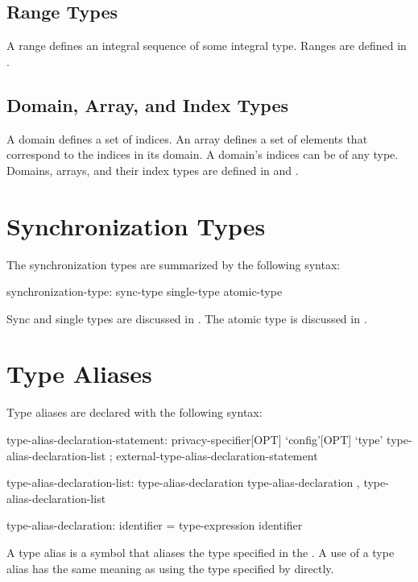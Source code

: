 \subsection{Range Types}
\label{Types_Range_Types}

A range defines an integral sequence of some integral type.  Ranges
are defined in .

\subsection{Domain, Array, and Index Types}
\label{Domain_and_Array_Types}

A domain defines a set of indices. An array defines a set of
elements that correspond to the indices in its domain.
A domain's indices can be of any type.
Domains, arrays, and their index
types are defined in  and .

\section{Synchronization Types}
\label{Synchronization_Types}

The synchronization types are summarized by the following syntax:

\begin{syntax}
synchronization-type:
  sync-type
  single-type
  atomic-type
\end{syntax}

Sync and single types are discussed in .
The atomic type is discussed in .

\clearpage
\section{Type Aliases}
\label{Type_Aliases}

Type aliases are declared with the following syntax:
\begin{syntax}
type-alias-declaration-statement:
  privacy-specifier[OPT] `config'[OPT] `type' type-alias-declaration-list ;
  external-type-alias-declaration-statement

type-alias-declaration-list:
  type-alias-declaration
  type-alias-declaration , type-alias-declaration-list

type-alias-declaration:
  identifier = type-expression
  identifier
\end{syntax}
A type alias is a symbol that aliases the type specified in the
.  A use of a type alias has the same meaning as using
the type specified by  directly.

